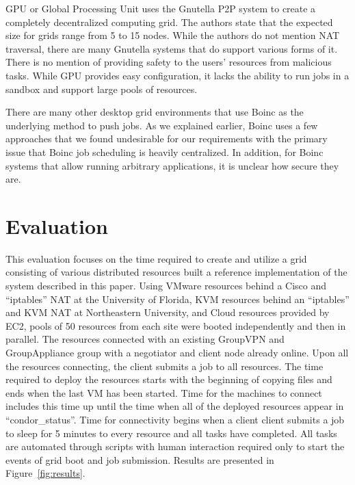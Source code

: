 \documentclass{sig-alternate}
\begin{document}
GPU or Global Processing Unit uses the Gnutella P2P system to create a
completely decentralized computing grid.  The authors state that the expected
size for grids range from 5 to 15 nodes.  While the authors do not mention NAT
traversal, there are many Gnutella systems that do support various forms of it.
There is no mention of providing safety to the users' resources from malicious
tasks.  While GPU provides easy configuration, it lacks the ability to run
jobs in a sandbox and support large pools of resources.

There are many other desktop grid environments that use Boinc as the underlying
method to push jobs.  As we explained earlier, Boinc uses a few approaches that
we found undesirable for our requirements with the primary issue that Boinc job
scheduling is heavily centralized.  In addition, for Boinc systems that allow
running arbitrary applications, it is unclear how secure they are.

\section{Evaluation}
\label{evaluation}
This evaluation focuses on the time required to create and utilize a grid
consisting of various distributed resources built a reference implementation of
the system described in this paper.  Using VMware resources behind a Cisco
and ``iptables'' NAT at the University of Florida, KVM resources behind an
``iptables'' and KVM NAT at Northeastern University, and Cloud resources
provided by EC2, pools of 50 resources from each site were booted independently
and then in parallel.  The resources connected with an existing GroupVPN and
GroupAppliance group with a negotiator and client node already online.  Upon
all the resources connecting, the client submits a job to all resources.  The
time required to deploy the resources starts with the beginning of copying
files and ends when the last VM has been started.  Time for the machines to
connect includes this time up until the time when all of the deployed resources
appear in ``condor\_status''.  Time for connectivity begins when a client
client submits a job to sleep for 5 minutes to every resource and all tasks
have completed.  All tasks are automated through scripts with human interaction
required only to start the events of grid boot and job submission.  Results are
presented in Figure~\ref{fig:results}.
\end{document}
